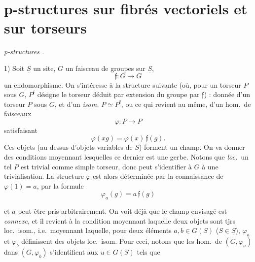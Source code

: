 \documentclass[11pt,a4paper]{article}
\begin{document}

\section*{p-structures sur fibrés vectoriels et sur torseurs}



\emph{p-structures .}

1) Soit $\underline{S}$ un site, $G$ un faisceau de groupes sur
$\underline{S}$,
\[
  \mathfrak{f} : G \longrightarrow G
\]
un endomorphisme. On s'intéresse à la structure suivante (où, pour un
torseur $P$ sous $G$, $P^{\mathfrak{f}}$ désigne le torseur déduit par
extension du groupe par $\mathfrak{f}$) : donnée d'un torseur $P$ sous $G$,
et d'un \emph{isom.} $P \simeq P^{\mathfrak{f}}$, ou ce qui revient au même,
d'un hom.\ de faisceaux
\[
  \varphi : P \longrightarrow P
\]
satisfaisant
\[
  \varphi(xg) = \varphi(x)\,\mathfrak{f}(g) .
\]
Ces objets (au dessus d'objets variables de $S$)
forment un champ. On va donner des conditions moyennant lesquelles ce
dernier est une gerbe. Notons que \emph{loc.}\ un tel $P$ est trivial comme
simple torseur, donc peut s'identifier à $G$  à une trivialisation. La
structure $\varphi$ est alors déterminée par la connaissance de
$\varphi(1) = a$, par la formule
\[
  \varphi_a(g) = a\,\mathfrak{f}(g)
\]


et $a$ peut être pris arbitrairement. On voit déjà que le champ envisagé est
\emph{connexe}, et il revient à \struck{\ill{}}  la condition
moyennant laquelle deux objets sont tjrs loc.\ isom., i.e.\ moyennant laquelle,
pour deux éléments $a, b \in G(S)$ ($S \in \underline{S}$), $\varphi_a$ et
$\varphi_b$ définissent des objets loc.\ isom. Pour ceci, notons que les hom.\
de $(G, \varphi_a)$ dans $(G, \varphi_b)$ s'identifient aux $u \in G(S)$ tels
que
\end{document}
